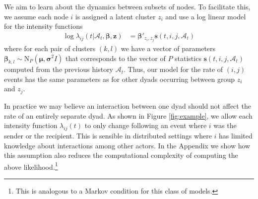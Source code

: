 %   


We aim to learn about the dynamics between subsets of nodes.   To facilitate this, we assume each node $i$ is assigned a latent cluster $z_i$ and use a log linear model for the intensity functions
\begin{align*}
\log \lambda_{ij}(t | \mathcal{A}_t,\mathbf{\beta},\mathbf{z}) &= \boldsymbol{\beta}'_{z_i,z_j} \mathbf{s}(t,i,j,\mathcal{A}_t)
\end{align*}
where for each pair of clusters $(k,l)$ we have a vector of parameters $\boldsymbol{\beta}_{k,l} \sim \mbox{N}_P(\boldsymbol{\mu},\boldsymbol{\sigma}^2I)$ that corresponds to the vector of $P$ statistics $\mathbf{s}(t,i,j,\mathcal{A}_t)$ computed from the previous history $\mathcal{A}_t$.
Thus, our model for the rate of $(i,j)$ events has the same parameters as for other dyads occurring between group $z_i$ and $z_j$.

 In practice we may believe an interaction between one dyad should not affect the rate of an entirely separate dyad.
As shown in Figure \ref{fig:example}, we allow each intensity function $\lambda_{ij}(t)$ to only change following an event where $i$ was the sender or the recipient.
This is sensible in distributed settings where $i$ has limited knowledge about interactions among other actors.
In the Appendix we show how this assumption also reduces the computational complexity of computing the above likelihood.\footnote{This is analogous to a Markov condition for this class of models.}

